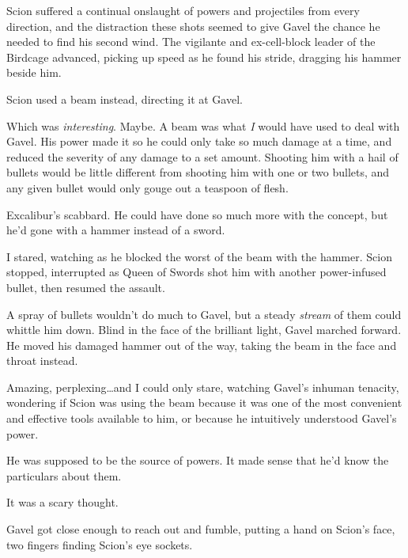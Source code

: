 Scion suffered a continual onslaught of powers and projectiles from every direction, and the distraction these shots seemed to give Gavel the chance he needed to find his second wind.  The vigilante and ex-cell-block leader of the Birdcage advanced, picking up speed as he found his stride, dragging his hammer beside him.



Scion used a beam instead, directing it at Gavel.



Which was \emph{interesting}.  Maybe.  A beam was what \emph{I }would have used to deal with Gavel.  His power made it so he could only take so much damage at a time, and reduced the severity of any damage to a set amount.  Shooting him with a hail of bullets would be little different from shooting him with one or two bullets, and any given bullet would only gouge out a teaspoon of flesh.



Excalibur's scabbard.  He could have done so much more with the concept, but he'd gone with a hammer instead of a sword.



I stared, watching as he blocked the worst of the beam with the hammer.   Scion stopped, interrupted as Queen of Swords shot him with another power-infused bullet, then resumed the assault.



A spray of bullets wouldn't do much to Gavel, but a steady \emph{stream} of them could whittle him down.  Blind in the face of the brilliant light, Gavel marched forward.  He moved his damaged hammer out of the way, taking the beam in the face and throat instead.



Amazing, perplexing\ldots and I could only stare, watching Gavel's inhuman tenacity, wondering if Scion was using the beam because it was one of the most convenient and effective tools available to him, or because he intuitively understood Gavel's power.



He was supposed to be the source of powers.  It made sense that he'd know the particulars about them.



It was a scary thought.



Gavel got close enough to reach out and fumble, putting a hand on Scion's face, two fingers finding Scion's eye sockets.



